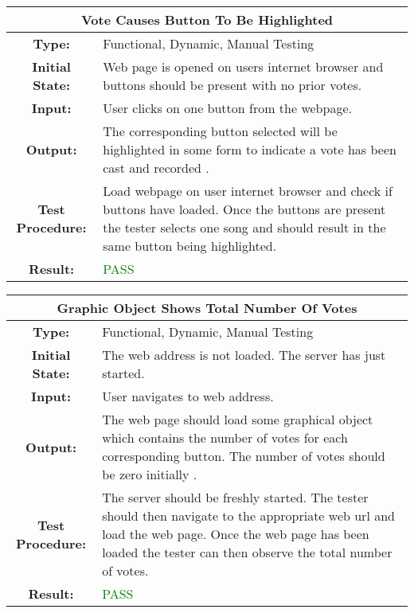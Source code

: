 \documentclass[12pt, titlepage]{article}
\begin{document}
\begin{center}
\begin{table}[H]
\begin{tabularx}{\textwidth}{| c X |}
\hline
\multicolumn{2}{|c|}{\textbf{Vote Causes Button To Be Highlighted}}\\
\hline
\textbf{Type: } & Functional, Dynamic, Manual Testing\\


\textbf{Initial State: } & Web page is opened on users internet browser and buttons should be present with no prior votes.\\


\textbf{Input: } & User clicks on one button from the webpage.\\


\textbf{Output: } & The corresponding button selected will be highlighted in some form to indicate a vote has been cast and recorded .\\


\textbf{Test Procedure:  } & Load webpage on user internet browser and check if buttons have loaded. Once the buttons are present the tester selects one song and should result in the same button being highlighted.\\


\textbf{Result: } & \textcolor{green}{PASS}\\
\hline
\end{tabularx}
\end{table}
\end{center}


\begin{center}
\begin{table}[H]
\begin{tabularx}{\textwidth}{| c X |}
\hline
\multicolumn{2}{|c|}{\textbf{Graphic Object Shows Total Number Of Votes}}\\
\hline
\textbf{Type: } & Functional, Dynamic, Manual Testing\\


\textbf{Initial State: } & The web address is not loaded. The server has just started.\\


\textbf{Input: } & User navigates to web address.\\


\textbf{Output: } & The web page should load some graphical object which contains the number of votes for each corresponding button. The number of votes should be zero initially .\\


\textbf{Test Procedure:  } & The server should be freshly started. The tester should then navigate to the appropriate web url and load the web page. Once the web page has been loaded the tester can then observe the total number of votes.\\


\textbf{Result: } & \textcolor{green}{PASS}\\
\hline
\end{tabularx}
\end{table}
\end{center}
\end{document}
